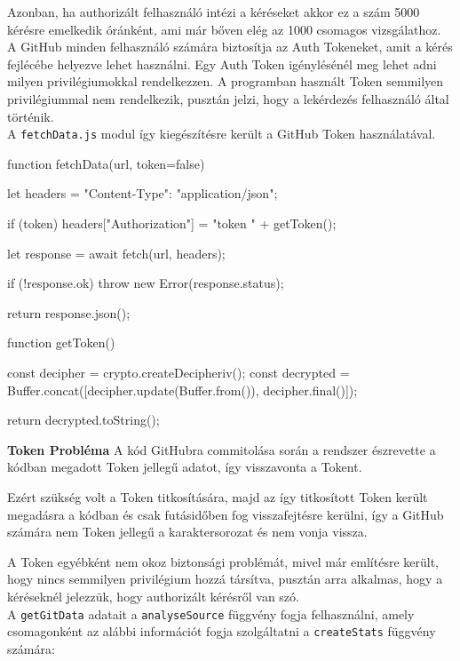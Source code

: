 Azonban, ha authorizált felhasználó intézi a kéréseket akkor ez a szám 5000 kérésre emelkedik óránként, ami már bőven elég az 1000 csomagos vizsgálathoz.\\

A GitHub minden felhasználó számára biztosítja az Auth Tokeneket, amit a kérés fejlécébe helyezve lehet használni. Egy Auth Token igénylésénél meg lehet adni milyen privilégiumokkal rendelkezzen. A programban használt Token semmilyen privilégiummal nem rendelkezik, pusztán jelzi, hogy a lekérdezés felhasználó által történik.\\

A \texttt{fetchData.js} modul így kiegészítésre került a GitHub Token használatával.

\pagebreak

\begin{js}
function fetchData(url, token=false) {
  let headers = {"Content-Type": "application/json"};

  if (token) {
    headers["Authorization"] = "token " + getToken();
  }

  let response = await fetch(url, {headers});

  if (!response.ok) {
    throw new Error(response.status);
  }

  return response.json();
}

function getToken() {
  const decipher = crypto.createDecipheriv();
  const decrypted = Buffer.concat([decipher.update(Buffer.from()),
					decipher.final()]);

  return decrypted.toString();
}
\end{js}
\textbf{Token Probléma} \newline A kód GitHubra commitolása során a rendszer észrevette a kódban megadott Token jellegű adatot, így visszavonta a Tokent. 

Ezért szükség volt a Token titkosítására, majd az így titkosított Token került megadásra a kódban és csak futásidőben fog visszafejtésre kerülni, így a GitHub számára nem Token jellegű a karaktersorozat és nem vonja vissza.

A Token egyébként nem okoz biztonsági problémát, mivel már említésre került, hogy nincs semmilyen privilégium hozzá társítva, pusztán arra alkalmas, hogy a kéréseknél jelezzük, hogy authorizált kérésről van szó.\\

A \texttt{getGitData} adatait a \texttt{analyseSource} függvény fogja felhasználni, amely csomagonként az alábbi információt fogja szolgáltatni a \texttt{createStats} függvény számára:

